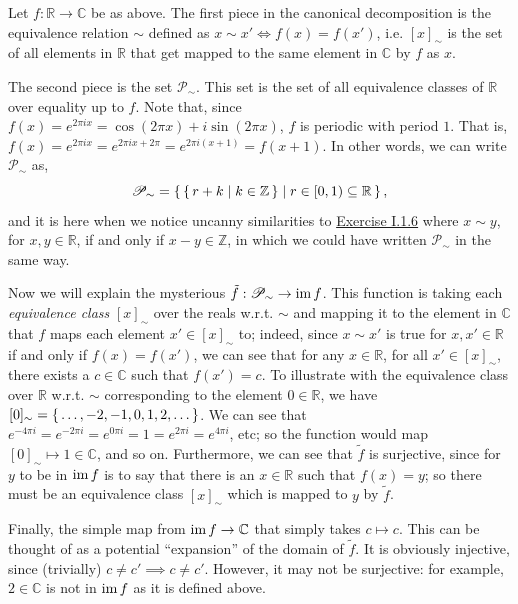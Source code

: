 \begin{solution}
	Let $f:\mathbb{R}\to\mathbb{C}$ be as above. The first piece in the canonical
	decomposition is the equivalence relation $\sim$ defined as $x \sim x' \iff f(x) =
	f(x')$, i.e. $[x]_{\sim}$ is the set of all elements in $\mathbb{R}$ that get
	mapped to the same element in $\mathbb{C}$ by $f$ as $x$.
	
	The second piece is the set $\mathscr{P}_{\sim}$. This set is the set of all
	equivalence classes of $\mathbb{R}$ over equality up to $f$. Note that, since
	$f(x) = e^{2\pi i x} = \cos(2\pi x) + i\sin(2\pi x)$, $f$ is periodic with
	period $1$. That is, $f(x) = e^{2\pi i x} = e^{2\pi i x + 2\pi} = e^{2\pi i (x +
		1)} = f(x+1)$. In other words, we can write $\mathscr{P}_{\sim}$ as,
	\[ \mathscr{P}_{\sim} = \left\{\,\left\{\,r + k\mid k\in\mathbb{Z}\,\right\}\mid
		r\in[0,1)\subseteq\mathbb{R}\,\right\}, \]
	and it is here when we notice uncanny similarities to \hyperlink{Exercise I.1.6}{Exercise I.1.6}
	where $x\sim y$, for $x,y\in\mathbb{R}$, if and only if $x-y\in\mathbb{Z}$, in
	which we could have written $\mathscr{P}_{\sim}$ in the same way. 
	
	Now we will explain the mysterious $\tilde{f}:\mathscr{P}_{\sim}\to\mathrm{im}\hspace{1.5pt} f$. This
	function is taking each \textit{equivalence class} $[x]_{\sim}$ over the reals
	w.r.t. $\sim$ and mapping it to the element in $\mathbb{C}$ that $f$ maps each
	element $x'\in[x]_{\sim}$ to; indeed, since $x\sim x'$ is true for
	$x,x'\in\mathbb{R}$ if and only if $f(x)=f(x')$, we can see that for any
	$x\in\mathbb{R}$, for all $x'\in[x]_{\sim}$, there exists a $c\in\mathbb{C}$
	such that $f(x') = c$. To illustrate with the equivalence class over
	$\mathbb{R}$ w.r.t. $\sim$ corresponding to the element $0\in\mathbb{R}$, we
	have $[0]_{\sim} = \left\{\,\dots, -2, -1, 0, 1, 2, \dots\,\right\}$.  We can see that
	$e^{-4\pi i} = e^{-2\pi i} = e^{0\pi i} = 1 = e^{2\pi i} = e^{4\pi i}$, etc; so
	the function would map $[0]_{\sim}\mapsto1\in\mathbb{C}$, and so on.
	Furthermore, we can see that $\tilde{f}$ is surjective, since for $y$ to be in
	$\mathrm{im}\hspace{1.5pt} f$ is to say that there is an $x\in\mathbb{R}$ such that $f(x) = y$; so
	there must be an equivalence class $[x]_{\sim}$ which is mapped to $y$ by
	$\tilde{f}$.
	
	Finally, the simple map from $\mathrm{im}\hspace{1.5pt} f\to\mathbb{C}$ that simply takes $c\mapsto
	c$. This can be thought of as a potential ``expansion'' of the domain of
	$\tilde{f}$. It is obviously injective, since (trivially) $c\neq c'\implies
	c\neq c'$. However, it may not be surjective: for example, $2\in\mathbb{C}$ is
	not in $\mathrm{im}\hspace{1.5pt} f$ as it is defined above.
\end{solution}


